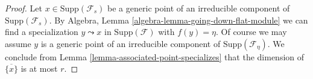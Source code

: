 \documentclass[10pt,a4paper]{amsart}
\theoremstyle{plain}
\theoremstyle{definition}
\theoremstyle{remark}
\numberwithin{equation}{subsection}
\begin{document}
\begin{proof}
Let $x \in \text{Supp}(\mathcal{F}_s)$ be a generic point of an irreducible
component of $\text{Supp}(\mathcal{F}_s)$. By
Algebra, Lemma \ref{algebra-lemma-going-down-flat-module}
we can find a specialization $y \leadsto x$ in $\text{Supp}(\mathcal{F})$
with $f(y) = \eta$. Of course we may assume $y$ is a generic point
of an irreducible component of $\text{Supp}(\mathcal{F}_\eta)$.
We conclude from Lemma \ref{lemma-associated-point-specializes}
that the dimension of $\overline{\{x\}}$ is at most $r$.
\end{proof}
\end{document}
